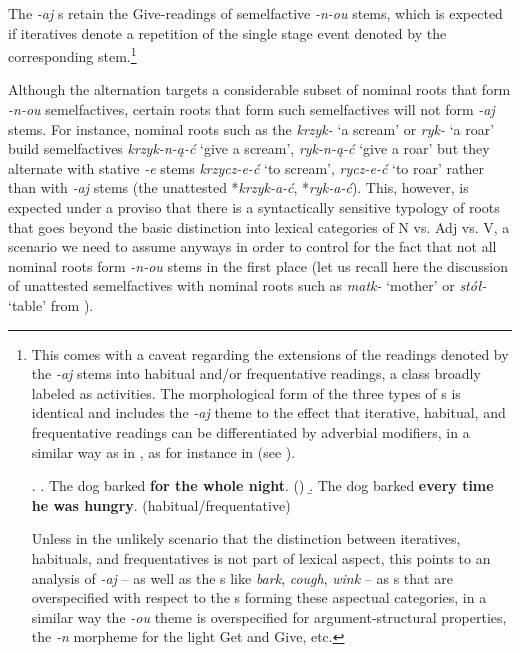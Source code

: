 \noindent The \textit{-aj} s retain the Give-readings  of  semelfactive \textit{-n-ou} stems, which is expected if iteratives denote a repetition of the single stage event denoted by the corresponding  stem.\footnote{This comes with a caveat regarding the extensions of the  readings denoted by the \textit{-aj} stems into habitual and/or frequentative readings, a class broadly labeled as activities. The morphological form of the three types of  s is identical and includes the \textit{-aj} theme to the effect that iterative, habitual, and frequentative readings can be differentiated by adverbial modifiers, in a similar way as in , as for instance in \Next (see \citealt{Carlson2012}). 

\ex. 
\a. The dog barked \textbf{for the whole night}. \hfill ()
\b. The dog barked \textbf{every time he was hungry}.  \hfill (habitual/frequentative)

Unless in the unlikely scenario that the distinction between iteratives, habituals, and frequentatives is not part of lexical aspect, this points to an analysis of \textit{-aj} -- as well as the  s like \textit{bark}, \textit{cough}, \textit{wink} -- as s that are overspecified with respect to the s forming these aspectual categories, in a similar way the \textit{-ou} theme is  overspecified for argument-structural properties, the \textit{-n} morpheme for the light Get and Give, etc. 
} %
\par
Although the  alternation targets a considerable subset of nominal roots that form \textit{-n-ou} semelfactives, certain roots that form such semelfactives will not form  \textit{-aj} stems. For instance, nominal roots such as the  \textit{krzyk-} `a scream' or \textit{ryk-} `a roar' build  semelfactives \textit{krzyk-n-\k{a}-\'c} `give a scream', \textit{ryk-n-\k{a}-\'c} `give a roar' but they alternate with stative \textit{-e} stems \textit{krzycz-e-\'c} `to scream', \textit{rycz-e-\'c} `to roar' rather than with  \textit{-aj} stems (the unattested *\textit{krzyk-a-\'c}, *\textit{ryk-a-\'c}). This, however, is expected under a proviso that there is a syntactically sensitive typology of roots that goes beyond the basic distinction into lexical categories of N vs. Adj vs. V, a scenario we need to assume anyways in order to control for the fact that not all nominal roots form  \textit{-n-ou} stems in the first place (let us recall here the discussion of unattested  semelfactives with nominal roots such as \textit{matk-} `mother' or \textit{st\'o\l-} `table' from ).
